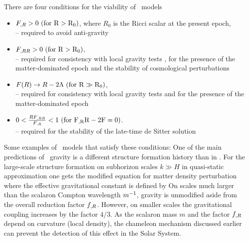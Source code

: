 There are four conditions for the viability of \fR\ models \parencite{Amendola_2007}
\begin{itemize}
	\item $F_{,R}>0\ (\rm{for\ } R>R_0)$, where $R_0$ is the Ricci scalar at the present epoch,\\
	-- required to avoid anti-gravity \parencite{2010deto.book.....A}\\
	\item $F_{,RR}>0\ (\rm{for\ } R>R_0)$,\\
	-- required for consistency with local gravity tests \parencite{2005gr.qc.....5136O}, for the presence of the matter-dominated epoch \parencite{2007PhRvL..98m1302A} and the stability of cosmological perturbations \parencite{2007PhRvD..75d4004S}\\
	\item $F(R)\rightarrow R-2\Lambda\ (\rm{for\ } R\gg R_0)$,\\
	-- required for consistency with local gravity tests \parencite{2008PhRvD..77b3507T} and for the presence of the matter-dominated epoch \parencite{Amendola_2007}\\
	\item $0<\frac{RF\RR}{F\R}<1\ (\rm{for\ } F\R R-2F=0)$.\\
	-- required for the stability of the late-time de Sitter solution \parencite{1988PhLB..202..198M}
\end{itemize}
Some examples of \fR\ models that satisfy these conditions:
One of the main predictions of \fR\ gravity is a different structure formation history than in \LCDM. For the large-scale structure formation on subhorizon scales \mbox{$k\gg H$} in quasi-static approximation one gets the modified equation for matter density perturbation \parencite{2011RSPTA.369.4947B}
where the effective gravitational constant is defined by
On scales much larger than the scalaron Compton wavelength $m^{-1}$, gravity is unmodified aside from the overall reduction factor $f_{,R}$. However, on smaller scales the gravitational coupling increases by the factor $4/3$. As the scalaron mass $m$ and the factor $f_{,R}$ depend on curvature (local density), the chameleon mechanism discussed earlier can prevent the detection of this effect in the Solar System.

